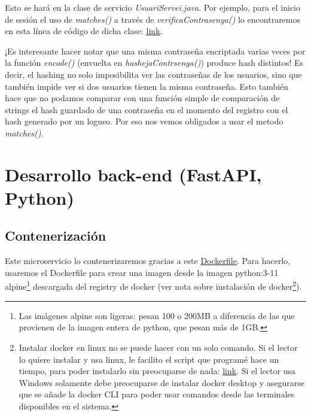 \documentclass[a4paper,12pt]{report}
\begin{document}
			Esto se hará en la clase de servicio \textit{UsuariServei.java}. Por ejemplo, para el inicio de sesión el uso de \textit{matches()} a través de \textit{ verificaContrasenya()} lo encontraremos en esta línea de código de dicha clase:  \href{https://github.com/blackcub3s/mercApp/blob/e8afa7110971dca00a660bd8ec5f1a565b852fbd/APP%20WEB/__springboot__produccio__/app/src/main/java/miApp/app/Usuaris/servei/UsuariServei.java#L67}{link}.
			

			
			
			¡Es interesante hacer notar que una misma contraseña encriptada varias veces por la función \textit{encode()} (envuelta en \textit{hashejaContrsenya()}) produce hash distintos! Es decir, el hashing no solo imposibilita ver las contraseñas de los usuarios, sino que también impide ver si dos usuarios tienen la misma contraseña. Esto también hace que no podamos comparar con una función simple de comparación de strings el hash guardado de una contraseña en el momento del registro con el hash generado por un logueo. Por eso nos vemos obligados a usar el metodo \textit{matches()}.
			
			
			
			
			

			
	\section{Desarrollo back-end (FastAPI, Python)}
	
	\subsection{Contenerización}
	\label{sec:conteneritzacioPython}
	
	Este microservicio lo contenerizaremos gracias a este \href{https://github.com/blackcub3s/mercApp/tree/main/APP%20WEB/__FastAPI__/Dockerfile}{Dockerfile}. Para hacerlo, usaremos el Dockerfile para crear una imagen desde la imagen python:3-11 alpine\footnote{Las imágenes alpine son ligeras: pesan 100 o 200MB a diferencia de las que provienen de la imagen entera de python, que pesan más de 1GB.} descargada del registry de docker (ver nota sobre instalación de docker\footnote{ Instalar docker en linux no se puede hacer con un solo comando. Si el lector lo quiere instalar y usa linux, le facilito el script que programé hace un tiempo, para poder instalarlo sin preocuparse de nada: \href{https://github.com/blackcub3s/mercApp/blob/main/auxiliars/instalaDocker.sh}{link}. Si el lector usa Windows solamente debe preocuparse de instalar docker desktop y asegurarse que se añade la docker CLI para poder usar comandos desde las terminales disponibles en el sistema.}). 
	
\end{document}
